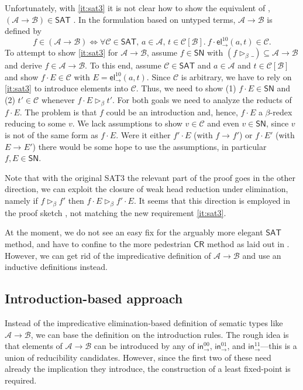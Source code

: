 \documentclass[a4paper,USenglish,cleveref, autoref, thm-restate]{lipics-v2019}
\newcommand{\tin}{\ensuremath{\mathsf{in}}}
\newcommand{\inn}[2]{\ensuremath{\tin_{#1}^{#2}}}
\newcommand{\tel}{\mathsf{el}}
\newcommand{\el}[2]{\ensuremath{\tel_{#1}^{#2}}}
\newcommand{\whd}[1][]{\rhd_{#1}}
\newcommand{\red}[1][]{\longrightarrow_{#1}}
\newcommand{\CR}{\mathsf{CR}}
\newcommand{\A}{\mathcal{A}}
\newcommand{\B}{\mathcal{B}}
\newcommand{\C}{\mathcal{C}}
\newcommand{\SN}{\mathsf{SN}}
\newcommand{\SAT}{\mathsf{SAT}}
\begin{document}
Unfortunately, with \ref{it:sat3} it is not clear how to show the equivalent of
, $(\A \to \B) \in \SAT$ \cite[Lemma~58]{geuversHurkens:types17}.
In the formulation based on untyped terms, $\A \to \B$ is defined by
\[
  f \in (\A \to \B)
  \iff
  \forall \C \in \SAT, \,
  a \in \A, \,
  t \in \C[\B].\
  f \cdot \el\to{10}(a,t) \in \C .
\]
To attempt to show \ref{it:sat3} for $\A \to \B$, assume $f \in \SN$ with
$(f \whd[\beta]\_) \subseteq \A \to \B$ and derive $f \in \A \to \B$.
To this end, assume $\C \in \SAT$ and $a \in \A$ and $t \in \C[\B]$
and show $f \cdot E \in \C$ with $E = \el\to{10}(a,t)$.  Since $\C$ is
arbitrary, we have to rely on \ref{it:sat3} to introduce elements into
$\C$.  Thus, we need to show (1) $f \cdot E \in \SN$ and (2)
$t' \in \C$ whenever $f \cdot E \whd[\beta] t'$.  For both goals we need to
analyze the reducts of $f \cdot E$.  The problem is that $f$ could be
an introduction and, hence, $f \cdot E$ a $\beta$-redex reducing to
some $v$.  We lack assumptions to show $v \in \C$ and even $v \in
\SN$, since $v$ is not of the same form as $f \cdot E$.  Were it either
$f' \cdot E$ (with $f \red f'$) or $f \cdot E'$ (with $E \red E'$)
there would be some hope to use the assumptions, in particular $f,E \in \SN$.

Note that with the original SAT3 the relevant part of the proof goes
in the other direction, we can exploit the closure of weak head
reduction under elimination, namely if $f \whd[\beta] f'$
then $f \cdot E \whd[\beta] f' \cdot E$.  It seems that this direction
is employed in the proof sketch
\cite[Lemma~58.c]{geuversHurkens:types17}, not matching the new
requirement \ref{it:sat3}.

At the moment, we do not see an easy fix for the arguably more elegant
$\SAT$ method, and have to confine to the more pedestrian $\CR$ method
as laid out in \Cref{sec:elimbased}.  However, we can get rid of the
impredicative definition of $\A \to \B$ and use an inductive
definitions instead.


\subsection{Introduction-based approach}
\label{sec:introbased}

Instead of the impredicative elimination-based definition of sematic
types like $\A \to \B$, we can base the definition on the introduction
rules.  The rough idea is that elements of $\A \to \B$ can be
introduced by any of $\inn\to{00}$, $\inn\to{01}$, and
$\inn\to{11}$---this is a union of reducibility candidates.
However, since the first two of these need already the implication
they introduce, the construction of a least fixed-point is required.
\end{document}
